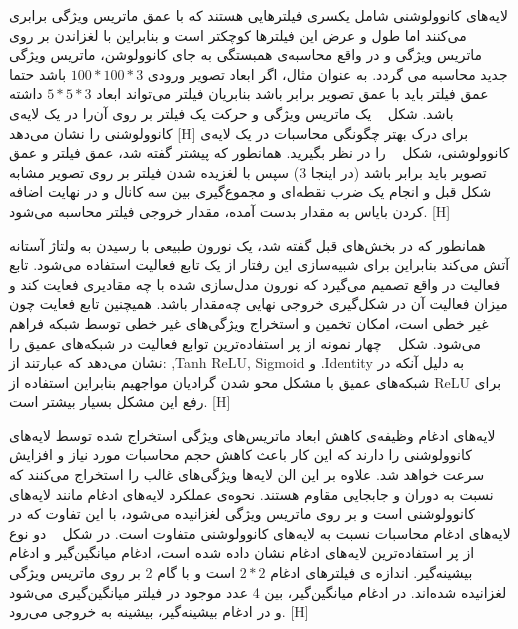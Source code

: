 لایه‌های کانوولوشنی شامل یکسری فیلترهایی هستند که با عمق ماتریس ویژگی برابری می‌کنند اما طول‌ و عرض این فیلترها کوچکتر است و بنابراین با لغزاندن بر روی ماتریس ویژگی و در واقع محاسبه‌ی همبستگی به جای کانوولوشن، ماتریس ویژگی جدید محاسبه‌ می گردد. به عنوان مثال، اگر ابعاد تصویر ورودی $100*100*3$ باشد حتما عمق فیلتر باید با عمق تصویر برابر باشد بنابریان فیلتر می‌تواند ابعاد $5*5*3$ داشته باشد. شکل ~ یک ماتریس ویژگی و حرکت یک فیلتر بر روی آن‌را در یک لایه‌ی کانوولوشنی را نشان می‌دهد
[H]
برای درک بهتر چگونگی محاسبات در یک لایه‌ی کانوولوشنی، شکل ~ را در نظر بگیرید. همانطور که پیشتر گفته شد، عمق فیلتر و عمق تصویر باید برابر باشد (در اینجا 3) سپس با لغزیده شدن فیلتر بر روی تصویر مشابه شکل قبل و انجام یک ضرب نقطه‌ای و مجموع‌گیری بین سه کانال و در نهایت اضافه کردن بایاس به مقدار بدست آمده، مقدار خروجی فیلتر محاسبه می‌شود.
[H]

همانطور که در بخش‌های قبل گفته شد، یک نورون طبیعی با رسیدن به ولتاژ آستانه آتش می‌کند بنابراین برای شبیه‌سازی این رفتار از یک تابع فعالیت استفاده می‌شود. تابع فعالیت در واقع تصمیم می‌گیرد که نورون مدل‌سازی شده با چه مقادیری فعایت کند و میزان فعالیت آن در شکل‌گیری خروجی نهایی چه‌مقدار باشد. همیچنین تابع فعایت چون غیر خطی است، امکان تخمین و استخراج ویژگی‌های غیر خطی توسط شبکه فراهم می‌شود. شکل ~ چهار نمونه از پر استفاده‌ترین توابع فعالیت در شبکه‌های عمیق را نشان می‌دهد که عبارتند از: ,Tanh
ReLU,
 Sigmoid و .Identity به دلیل آنکه در شبکه‌های عمیق با مشکل محو شدن گرادیان مواجهیم بنابراین استفاده از ReLU برای رفع این مشکل بسیار بیشتر است.
[H]

لایه‌های ادغام وظیفه‌ی کاهش ابعاد ماتریس‌های ویژگی استخراج شده توسط لایه‌های کانوولوشنی را دارند که این کار باعث کاهش حجم محاسبات مورد نیاز و افزایش سرعت خواهد شد. علاوه بر این الن لایه‌ها ویژگی‌های غالب را استخراج می‌کنند که نسبت به دوران و جابجایی مقاوم هستند. نحوه‌ی عملکرد لایه‌های ادغام مانند لایه‌های کانوولوشنی است و بر روی ماتریس ویژگی لغزانیده می‌شود، با این تفاوت که در لایه‌های ادغام محاسبات نسبت به لایه‌های کانوولوشنی متفاوت است. در شکل ~ دو نوع از پر استفاده‌ترین لایه‌های ادغام نشان داده شده است، ادغام میانگین‌گیر و ادغام بیشینه‌گیر. اندازه ی فیلترهای ادغام $2*2$ است و با گام 2 بر روی ماتریس ویژگی لغزانیده شده‌اند. در ادغام میانگین‌گیر، بین 4 عدد موجود در فیلتر میانگین‌گیری می‌شود و در ادغام بیشینه‌گیر، بیشینه به خروجی می‌رود.
[H]


